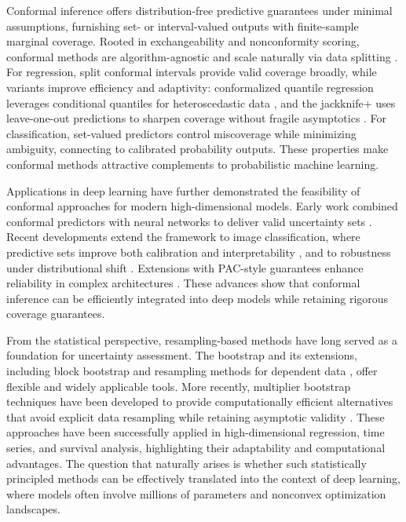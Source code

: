 \documentclass[12pt, titlepage, reqno]{article}
\begin{document}
Conformal inference offers distribution-free predictive guarantees
under minimal assumptions, furnishing set- or interval-valued outputs
with finite-sample marginal coverage. Rooted in exchangeability and
nonconformity scoring, conformal methods are algorithm-agnostic and
scale naturally via data splitting \citep{vovk2005algorithmic,
lei2018distribution, angelopoulos2023conformal}. For regression, split
conformal intervals provide valid coverage broadly, while variants
improve efficiency and adaptivity: conformalized quantile regression
leverages conditional quantiles for heteroscedastic data
\citep{romano2019conformalized}, and the jackknife+ uses leave-one-out
predictions to sharpen coverage without fragile asymptotics
\citep{barber2021predictive}. For classification, set-valued
predictors control miscoverage while minimizing ambiguity, connecting
to calibrated probability outputs. These properties make conformal
methods attractive complements to probabilistic machine learning.


Applications in deep learning have further demonstrated the
feasibility of conformal approaches for modern high-dimensional
models. Early work combined conformal predictors with neural networks
to deliver valid uncertainty sets \citep{papadopoulos2007conformal}.
Recent developments extend the framework to image classification,
where predictive sets improve both calibration and interpretability
\citep{angelopoulos2021uncertainty}, and to robustness under
distributional shift \citep{stutz2022conformal}. Extensions with
PAC-style guarantees enhance reliability in complex architectures
\citep{park2022pac}. These advances show that conformal inference can
be efficiently integrated into deep models while retaining rigorous
coverage guarantees.


From the statistical perspective, resampling-based methods have long
served as a foundation for uncertainty assessment. The bootstrap
\citep{efron1994introduction} and its extensions, including block
bootstrap and resampling methods for dependent data
\citep{lahiri2003resampling}, offer flexible and widely applicable
tools. More recently, multiplier bootstrap techniques have been
developed to provide computationally efficient alternatives that avoid
explicit data resampling while retaining asymptotic validity
\citep{zhou2012multiplier, chen2020jackknife}. These approaches have
been successfully applied in high-dimensional regression, time series,
and survival analysis, highlighting their adaptability and
computational advantages. The question that naturally arises is
whether such statistically principled methods can be effectively
translated into the context of deep learning, where models often
involve millions of parameters and nonconvex optimization landscapes.
\end{document}
